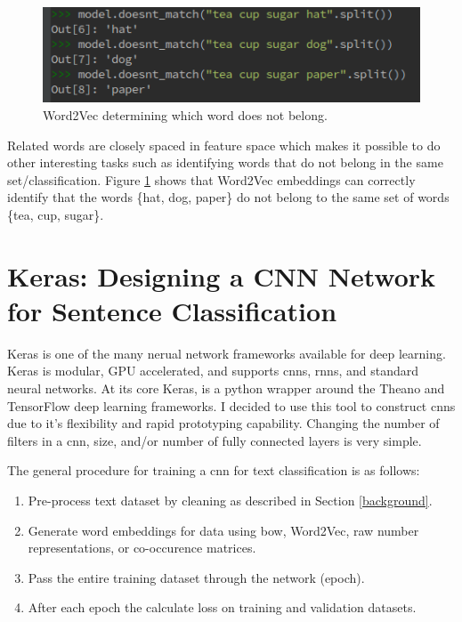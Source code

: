 \documentclass[12pt]{article}
\begin{document}
\begin{figure}[htbp!]
	\centering
	\includegraphics[scale=.5]{tea_cup.png}
	\caption{Word2Vec determining which word does not belong.}
	\label{fig:tea_cup}
\end{figure}

Related words are closely spaced in feature space which makes it possible to do other interesting tasks such as identifying words that do not belong in the same set/classification. Figure \ref{fig:tea_cup} shows that Word2Vec embeddings can correctly identify that the words \{hat, dog, paper\} do not belong to the same set of words \{tea, cup, sugar\}.


\section {Keras: Designing a CNN Network for Sentence Classification}
Keras \cite{chollet2015keras} is one of the many nerual network frameworks available for deep learning. Keras is modular, GPU accelerated, and supports \ac{cnn}s, \ac{rnn}s, and standard neural networks. At its core Keras, is a python wrapper around the Theano and TensorFlow deep learning frameworks. I decided to use this tool to construct \ac{cnn}s due to it's flexibility and rapid prototyping capability. Changing the number of filters in a \ac{cnn}, size, and\slash or number of fully connected layers is very simple. 

The general procedure for training a \ac{cnn} for text classification is as follows:

\begin{enumerate}
	\item Pre-process text dataset by cleaning as described in Section \ref{background}.
	\item Generate word embeddings for data using \ac{bow}, Word2Vec, raw number representations, or co-occurence matrices.
	\item Pass the entire training dataset through the network (epoch).
	\item After each epoch the calculate loss on training and validation datasets.
	\end{enumerate} 
\end{document}
